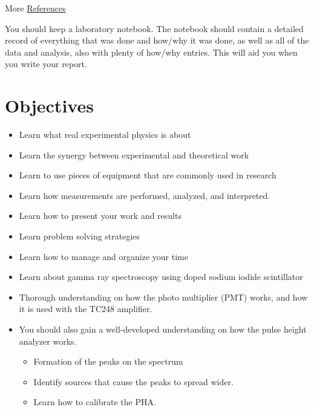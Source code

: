 \documentclass{../lab}
\begin{document}
\noindent More \hyperref[sec:References]{References}

You should keep a laboratory notebook. The notebook should contain a detailed record of everything that was done and how/why it was done, as well as all of the data and analysis, also with plenty of how/why entries. This will aid you when you write your report.

\section{Objectives}

\begin{itemize}
    \item Learn what real experimental physics is about

    \item Learn the synergy between experimental and theoretical work

    \item Learn to use pieces of equipment that are commonly used in research

    \item Learn how measurements are performed, analyzed, and interpreted.

    \item Learn how to present your work and results

    \item Learn problem solving strategies

    \item Learn how to manage and organize your time

    \item Learn about gamma ray spectroscopy using doped sodium iodide scintillator

    \item Thorough understanding on how the photo multiplier (PMT) works, and how it is used with the %
    TC248 amplifier.

    \item You should also gain a well-developed understanding on how the pulse height analyzer works.

    \begin{itemize}
        \item Formation of the peaks on the spectrum

        \item Identify sources that cause the peaks to spread wider.

        \item Learn how to calibrate the PHA.


\end{itemize}
\end{itemize}
\end{document}
